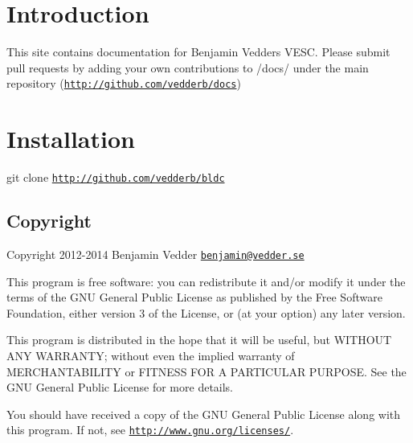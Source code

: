\hypertarget{index_intro_sec}{}\section{Introduction}\label{index_intro_sec}
This site contains documentation for Benjamin Vedder\textquotesingle{}s V\+E\+S\+C. Please submit pull requests by adding your own contributions to /docs/ under the main repository (\href{http://github.com/vedderb/docs}{\tt http\+://github.\+com/vedderb/docs})\hypertarget{index_install_sec}{}\section{Installation}\label{index_install_sec}
git clone \href{http://github.com/vedderb/bldc}{\tt http\+://github.\+com/vedderb/bldc}\hypertarget{index_copyright}{}\subsection{Copyright}\label{index_copyright}
Copyright 2012-\/2014 Benjamin Vedder \href{mailto:benjamin@vedder.se}{\tt benjamin@vedder.\+se}

This program is free software\+: you can redistribute it and/or modify it under the terms of the G\+N\+U General Public License as published by the Free Software Foundation, either version 3 of the License, or (at your option) any later version.

This program is distributed in the hope that it will be useful, but W\+I\+T\+H\+O\+U\+T A\+N\+Y W\+A\+R\+R\+A\+N\+T\+Y; without even the implied warranty of M\+E\+R\+C\+H\+A\+N\+T\+A\+B\+I\+L\+I\+T\+Y or F\+I\+T\+N\+E\+S\+S F\+O\+R A P\+A\+R\+T\+I\+C\+U\+L\+A\+R P\+U\+R\+P\+O\+S\+E. See the G\+N\+U General Public License for more details.

You should have received a copy of the G\+N\+U General Public License along with this program. If not, see \href{http://www.gnu.org/licenses/}{\tt http\+://www.\+gnu.\+org/licenses/}. 